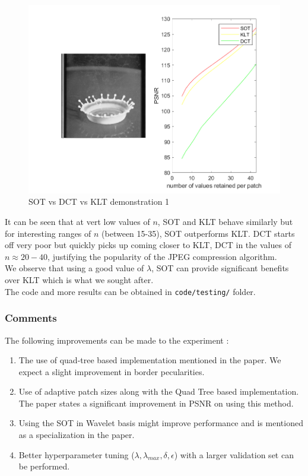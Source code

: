 \documentclass{article}
\theoremstyle{remark}
\begin{document}
\begin{figure}
\centering
\includegraphics[width=0.9\linewidth]{images/test3.png}
\caption{SOT vs DCT vs KLT demonstration 1}
\end{figure}
It can be seen that at vert low values of $n$, SOT and KLT behave similarly but for interesting ranges of $n$ (between 15-35), SOT outperforms KLT. DCT starts off very poor but quickly picks up coming closer to KLT, DCT in the values of $n \approx 20-40$, justifying the popularity of the JPEG compression algorithm.\\[1mm]
We observe that using a good value of $\lambda$, SOT can provide significant benefits over KLT which is what we sought after.\\[1mm]
The code and more results can be obtained in {\tt code/testing/} folder.
\subsubsection*{Comments}
The following improvements can be made to the experiment :
\begin{enumerate}
\item The use of quad-tree based implementation mentioned in the paper. We expect a slight improvement in border pecularities.
\item Use of adaptive patch sizes along with the Quad Tree based implementation. The paper states a significant improvement in PSNR on using this method.
\item Using the SOT in Wavelet basis might improve performance and is mentioned as a specialization in the paper.
\item Better hyperparameter tuning ($\lambda, \lambda_{max}, \delta, \epsilon$) with a larger validation set can be performed.
\end{enumerate}
\end{document}
